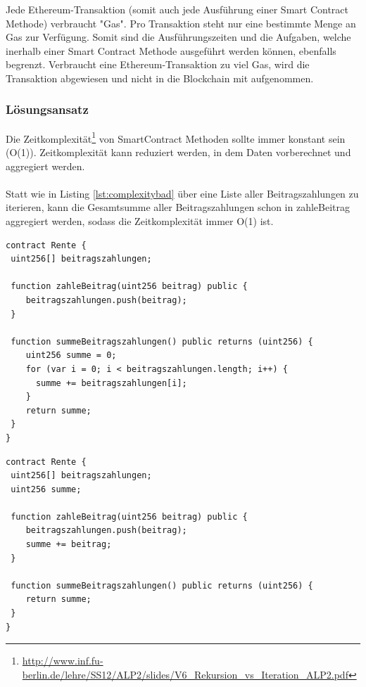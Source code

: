 Jede Ethereum-Transaktion (somit auch jede Ausführung einer Smart Contract Methode) verbraucht "Gas". Pro Transaktion steht nur eine bestimmte Menge an Gas zur Verfügung. Somit sind die Ausführungszeiten und die Aufgaben, welche inerhalb einer Smart Contract Methode ausgeführt werden können, ebenfalls begrenzt. 
Verbraucht eine Ethereum-Transaktion zu viel Gas, wird die Transaktion abgewiesen und nicht in die Blockchain mit aufgenommen.

\subsubsection*{Lösungsansatz}
Die Zeitkomplexität\footnote{\url{http://www.inf.fu-berlin.de/lehre/SS12/ALP2/slides/V6_Rekursion_vs_Iteration_ALP2.pdf}} von SmartContract Methoden sollte immer konstant sein (O(1)). Zeitkomplexität kann reduziert werden, in dem Daten vorberechnet und aggregiert werden.

\paragraph*{} 
Statt wie in Listing \ref{lst:complexitybad} über eine Liste aller Beitragszahlungen zu iterieren, kann die Gesamtsumme aller Beitragszahlungen schon in zahleBeitrag aggregiert werden, sodass die Zeitkomplexität immer O(1) ist.

\begin{lstlisting}[caption={Schlecht - Zeitkomplexität von summeBeitragszahlungen() ist O(n)},captionpos=b,label=lst:complexitybad]
contract Rente {
 uint256[] beitragszahlungen;

 function zahleBeitrag(uint256 beitrag) public {
	beitragszahlungen.push(beitrag);
 }
 
 function summeBeitragszahlungen() public returns (uint256) {
	uint256 summe = 0;
	for (var i = 0; i < beitragszahlungen.length; i++) {
      summe += beitragszahlungen[i];
	}
	return summe;	
 }
}
\end{lstlisting}


\begin{lstlisting}[caption={Gut - Zeitkomplexität von summeBeitragszahlungen() ist O(1)},captionpos=b,label=lst:complexitygood]
contract Rente {
 uint256[] beitragszahlungen;
 uint256 summe;

 function zahleBeitrag(uint256 beitrag) public {
	beitragszahlungen.push(beitrag);
	summe += beitrag;
 }
 
 function summeBeitragszahlungen() public returns (uint256) {
	return summe;	
 }
}
\end{lstlisting}


